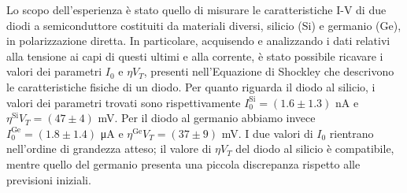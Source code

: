 Lo scopo dell’esperienza è stato quello di misurare le caratteristiche I-V di due diodi a semiconduttore costituiti da materiali diversi, silicio (Si) e germanio (Ge), in polarizzazione diretta. In particolare, acquisendo e analizzando i dati relativi alla tensione ai capi di questi ultimi e alla corrente, è stato possibile ricavare i valori dei parametri $I_0$ e $\eta V_T$, presenti nell’Equazione di Shockley che descrivono le caratteristiche fisiche di un diodo. Per quanto riguarda il diodo al silicio, i valori dei parametri trovati sono rispettivamente $I_0^\text{Si} = (1.6 \pm 1.3)$ \si{\nano\ampere} e $\eta^\text{Si}V_T = (47 \pm 4)$ \si{\milli\volt}. Per il diodo al germanio abbiamo invece $I_0^\text{Ge} = (1.8 \pm 1.4)$ \si{\micro\ampere} e $\eta^\text{Ge}V_T = (37 \pm 9)$ \si{\milli\volt}. I due valori di $I_0$ rientrano nell’ordine di grandezza atteso; il valore di $\eta V_T$ del diodo al silicio è compatibile, mentre quello del germanio presenta una piccola discrepanza rispetto alle previsioni iniziali.
